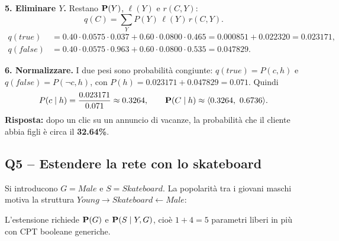 \textbf{5. Eliminare $Y$.} Restano $\mathbf{P}(Y)$, $\ell(Y)$ e $r(C,Y)$:
\[
  q(C) = \sum_Y P(Y)\,\ell(Y)\,r(C,Y).
\]
\begin{align*}
  q(\mathit{true})  &= 0.40\cdot0.0575\cdot0.037 + 0.60\cdot0.0800\cdot0.465
                     = 0.000851 + 0.022320 = 0.023171,\\
  q(\mathit{false}) &= 0.40\cdot0.0575\cdot0.963 + 0.60\cdot0.0800\cdot0.535 = 0.047829.
\end{align*}

\textbf{6. Normalizzare.} I due pesi sono probabilità congiunte:
$q(\mathit{true})=P(c,h)$ e $q(\mathit{false})=P(\neg c,h)$, con
$P(h)=0.023171+0.047829=0.071$. Quindi
\[
  P(c\mid h) = \frac{0.023171}{0.071}\approx 0.3264,
  \qquad
  \mathbf{P}(C\mid h)\approx\langle 0.3264,\ 0.6736\rangle.
\]
\textbf{Risposta:} dopo un clic su un annuncio di vacanze, la probabilità che
il cliente abbia figli è circa il \textbf{32.64\%}.

\subsection*{Q5 -- Estendere la rete con lo skateboard}

Si introducono $G=\mathit{Male}$ e $S=\mathit{Skateboard}$. La popolarità tra i
giovani maschi motiva la struttura $\mathit{Young}\to\mathit{Skateboard}\leftarrow\mathit{Male}$:

\begin{center}
\end{center}
L'estensione richiede $\mathbf{P}(G)$ e $\mathbf{P}(S\mid Y,G)$, cioè $1+4=5$ parametri liberi
in più con CPT booleane generiche.

